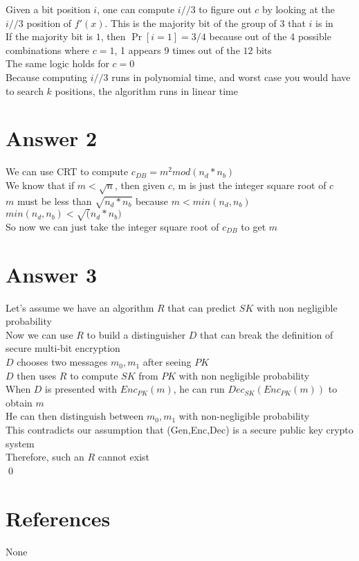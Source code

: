 \documentclass[11pt]{article}
\theoremstyle{definition}
\begin{document}
Given a bit position $i$, one can compute $i//3$ to figure out $c$ by looking at the $i//3$ position of $f'(x)$.  This is the majority bit of the group of 3 that $i$ is in\\
If the majority bit is $1$, then $\Pr[i = 1] = 3/4$ because out of the 4 possible combinations where $c = 1$, 1 appears 9 times out of the $12$ bits\\
The same logic holds for $c = 0$\\
Because computing $i//3$ runs in polynomial time, and worst case you would have to search $k$ positions, the algorithm runs in linear time\\

\section*{Answer 2}
We can use CRT to compute $c_{DB} = m^2 mod (n_d * n_b)$\\
We know that if $m < \sqrt{n}$, then given $c$, m is just the integer square root of $c$\\
$m$ must be less than $\sqrt{n_d * n_b}$ because $m < min(n_d,n_b)$\\
$min(n_d,n_b) < \sqrt(n_d * n_b)$\\
So now we can just take the integer square root of $c_{DB}$ to get $m$\\

\section*{Answer 3}
Let's assume we have an algorithm $R$ that can predict $SK$ with non negligible probability\\
Now we can use $R$ to build a distinguisher $D$ that can break the definition of secure multi-bit encryption\\
$D$ chooses two messages $m_0,m_1$ after seeing $PK$\\
$D$ then uses $R$ to compute $SK$ from $PK$ with non negligible probability\\
When $D$ is presented with $Enc_{PK}(m)$, he can run $Dec_{SK}(Enc_{PK}(m))$ to obtain $m$\\
He can then distinguish between $m_0,m_1$ with non-negligible probability\\
This contradicts our assumption that (Gen,Enc,Dec) is a secure public key crypto system\\
Therefore, such an $R$ cannot exist\\
\qed


\noindent\hrulefill


\section*{References}

None
\end{document}
